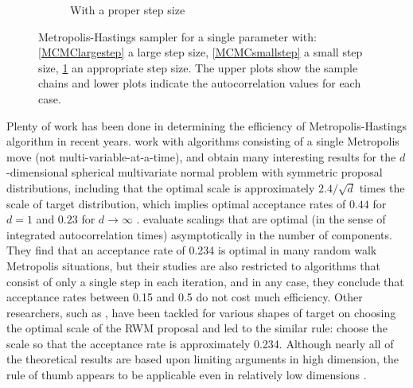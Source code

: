 \begin{figure}[h]
\begin{subfigure}[b]{0.32\textwidth}
    \caption{With a proper step size}\label{MCMCproperstep}
\end{subfigure}
\caption{Metropolis-Hastings sampler for a single parameter with: \ref{MCMClargestep} a large step size, \ref{MCMCsmallstep} a small step size, \ref{MCMCproperstep} an appropriate step size. The upper plots show the sample chains and lower plots indicate the autocorrelation values for each case.}
\label{largesmallstepsize}
\end{figure}


Plenty of work has been done in determining the efficiency of Metropolis-Hastings algorithm in recent years. \cite{gelman1996efficient} work with algorithms consisting of a single Metropolis move (not multi-variable-at-a-time), and obtain many interesting results for the $d$-dimensional spherical multivariate normal problem with symmetric proposal distributions, including that the optimal scale is approximately $2.4/\sqrt{d}$ times the scale of target distribution, which implies optimal acceptance rates of $0.44$ for $d = 1$ and $0.23$ for $d\rightarrow \infty$ \citep{gilks1995markov}. \cite{roberts2001optimal} evaluate scalings that are optimal (in the sense of integrated autocorrelation times) asymptotically in the number of components. They find that an acceptance rate of 0.234 is optimal in many random walk Metropolis situations, but their studies are also restricted to algorithms that consist of only a single step in each iteration, and in any case, they conclude that acceptance rates between 0.15 and 0.5 do not cost much efficiency. Other researchers, such as \citep{roberts1997weak, bedard2007weak, beskos2009optimal, sherlock2009optimal, sherlock2013optimal}, have been tackled for various shapes of target on choosing the optimal scale of the RWM proposal and led to the similar rule: choose the scale so that the acceptance rate is approximately 0.234. Although nearly all of the theoretical results are based upon limiting arguments in high dimension, the rule of thumb appears to be applicable even in relatively low dimensions \citep{sherlock2010random}. 



